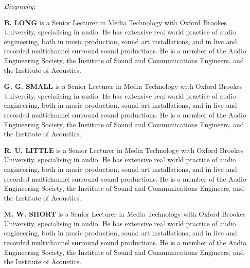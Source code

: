 \thispagestyle{empty}
\fontsize{10}{12}\selectfont

\textit{Biography:}

\textbf{B. LONG} is a Senior Lecturer in Media Technology with Oxford Brookes University, specialising in audio. He has extensive real world practice of audio engineering, both in music production, sound art installations, and in live and recorded multichannel surround sound productions. He is a member of the Audio Engineering Society, the Institute of Sound and Communications Engineers, and the Institute of Acoustics.  

\textbf{G. G. SMALL} is a Senior Lecturer in Media Technology with Oxford Brookes University, specialising in audio. He has extensive real world practice of audio engineering, both in music production, sound art installations, and in live and recorded multichannel surround sound productions. He is a member of the Audio Engineering Society, the Institute of Sound and Communications Engineers, and the Institute of Acoustics.  

\textbf{R. U. LITTLE} is a Senior Lecturer in Media Technology with Oxford Brookes University, specialising in audio. He has extensive real world practice of audio engineering, both in music production, sound art installations, and in live and recorded multichannel surround sound productions. He is a member of the Audio Engineering Society, the Institute of Sound and Communications Engineers, and the Institute of Acoustics.  


\textbf{M. W. SHORT} is a Senior Lecturer in Media Technology with Oxford Brookes University, specialising in audio. He has extensive real world practice of audio engineering, both in music production, sound art installations, and in live and recorded multichannel surround sound productions. He is a member of the Audio Engineering Society, the Institute of Sound and Communications Engineers, and the Institute of Acoustics.  
